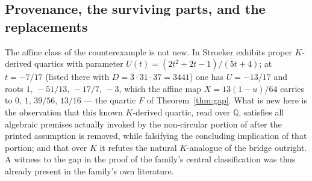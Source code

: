 \documentclass[11pt]{amsart}
\newcommand{\Q}{\mathbb{Q}}
\begin{document}
\subsection{Provenance, the surviving parts, and the replacements}
\label{sec:gap:provenance}

The affine class of the counterexample is not new.  In
{\cite[Ex.~5.2]{Stroeker2006}} Stroeker exhibits proper $K$-derived
quartics with parameter $U(t)=(2t^2+2t-1)/(5t+4)$; at $t=-7/17$ (listed
there with $D=3\cdot 31\cdot 37=3441$) one has $U=-13/17$ and roots
$1,\,-51/13,\,-17/7,\,-3$, which the affine map $X=13(1-u)/64$ carries
to $0,\,1,\,39/56,\,13/16$ --- the quartic $F$ of
Theorem~\ref{thm:gap}.  What is new here is the observation that this
known $K$-derived quartic, read over $\Q$, satisfies all algebraic
premises actually invoked by the non-circular portion of
{\cite[\S2.2.4]{BM2000}} after the printed assumption is removed, while
falsifying the concluding implication of that portion; and that over
$K$ it refutes the natural $K$-analogue of the bridge outright.  A
witness to the gap in the proof of the family's central classification
was thus already present in the family's own literature.
\end{document}
